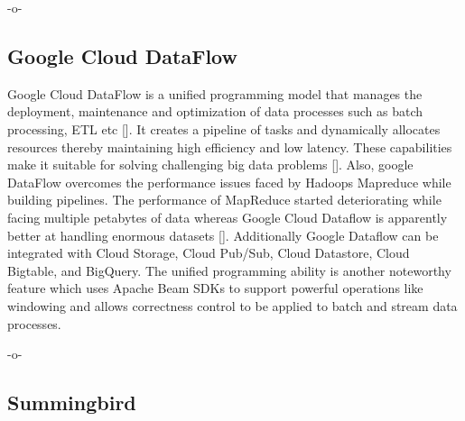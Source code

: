      -o-

\subsection{Google Cloud DataFlow}
     
Google Cloud DataFlow is a unified programming model that manages the
deployment, maintenance and optimization of data processes such as
batch processing, ETL etc [\cite{www-cloud-google1}]. It creates a
pipeline of tasks and dynamically allocates resources thereby
maintaining high efficiency and low latency. These capabilities make
it suitable for solving challenging big data problems
[\cite{www-cloud-google1}]. Also, google DataFlow overcomes the
performance issues faced by Hadoops Mapreduce while building
pipelines\cite{www-dataconomy}.  The performance of MapReduce started
deteriorating while facing multiple petabytes of data whereas Google
Cloud Dataflow is apparently better at handling enormous datasets
[\cite{www-cloud-google1}]. Additionally Google Dataflow can be
integrated with Cloud Storage, Cloud Pub/Sub, Cloud Datastore, Cloud
Bigtable, and BigQuery. The unified programming ability is another
noteworthy feature which uses Apache Beam SDKs to support powerful
operations like windowing and allows correctness control to be applied
to batch and stream data processes.

     -o-

     
\subsection{Summingbird }
     
